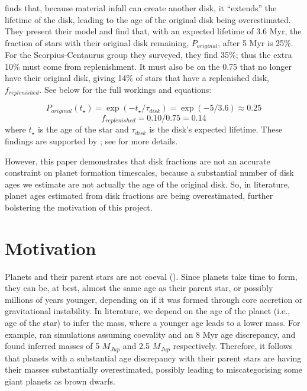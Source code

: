 \documentclass[11pt]{report}
\begin{document}
\begin{mainf}
\citet{Kuffmeier2026} finds that, because material infall can create another disk, it ``extends'' the lifetime of the disk, leading to the age of the original disk being overestimated.
They present their model and find that, with an expected lifetime of 3.6 Myr, the fraction of stars with their original disk remaining, $P_{original}$, after 5 Myr is 25\%. For the Scorpius-Centaurus group they surveyed, they find 35\%;
thus the extra 10\% must come from replenishment. It must also be on the 0.75 that no longer have their original disk, giving 14\% of stars that have a replenished disk, $f_{replenished}$. See below for the full workings and equations:

\[
P_{original}(t_\star) = \exp(-t_\star/\tau_{disk}) = \exp(-5/3.6) \approx 0.25
\]
\[
f_{replenished} = 0.10/0.75 = 0.14
\]
where $t_\star$ is the age of the star and $\tau_{disk}$ is the disk's expected lifetime. These findings are supported by \citet{Garufi2026}; see \citet{Kuffmeier2026} for more details. 

However, this paper demonstrates that disk fractions are not an accurate constraint on planet formation timescales,
because a substantial number of disk ages we estimate are not actually the age of the original disk. So, in literature, planet ages estimated from disk fractions are being overestimated, 
further bolstering the motivation of this project.


\chapter{Motivation}\label{chap:motivation}
Planets and their parent stars are not coeval (\citealp{Bowler2016a}). Since planets take time to form, they can be, at best, almost the same age as their parent star, or possibly millions of years younger, depending on if it was formed through core accretion or gravitational instability. 
In literature, we depend on the age of the planet (i.e., age of the star) to infer the mass, where a younger age leads to a lower mass. For example, \citet{Bowler2016a} ran simulations assuming coevality and an 8 Myr age discrepancy, and found inferred masses of 5 $M_{Jup}$ and 2.5 $M_{Jup}$ respectively.
Therefore, it follows that planets with a substantial age discrepancy with their parent stars are having their masses substantially overestimated, possibly leading to miscategorising some giant planets as brown dwarfs.


\end{mainf}
\end{document}

